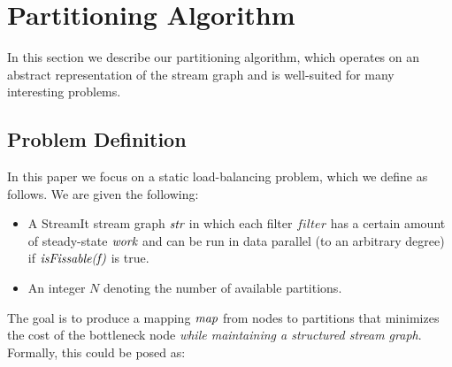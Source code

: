 \section{Partitioning Algorithm}

In this section we describe our partitioning algorithm, which operates
on an abstract representation of the stream graph and is well-suited
for many interesting problems.

\subsection{Problem Definition}

In this paper we focus on a static load-balancing problem, which we
define as follows.  We are given the following:
\begin{itemize}

\item A StreamIt stream graph $\mbox{\it str}$ in which each filter $filter$
has a certain amount of steady-state $\mbox{\it work}$ and can be run in
data parallel (to an arbitrary degree) if $\mbox{\it isFissable(f)}$ is
true.

\item An integer $N$ denoting the number of available partitions.

\end{itemize}

The goal is to produce a mapping $\mbox{\it map}$ from nodes to partitions
that minimizes the cost of the bottleneck node {\it while maintaining
a structured stream graph}.  Formally, this could be posed as:

\begin{center}
\end{center}

